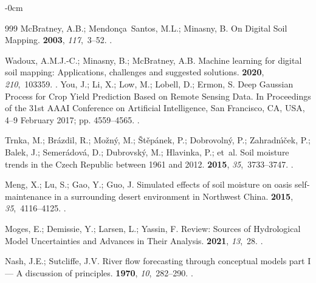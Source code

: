 \documentclass[land,review,accept,pdftex,oneauthor]{Definitions/mdpi}
\begin{document}
\begin{adjustwidth}{-\extralength}{0cm}
\begin{thebibliography}{999}
McBratney, A.B.; Mendon\c{c}a~Santos, M.L.; Minasny, B.
\newblock On Digital Soil Mapping.
 {\bf 2003}, {\em 117},~3--52.
.

Wadoux, A.M.J.-C.; Minasny, B.; McBratney, A.B.
\newblock Machine learning for digital soil mapping: Applications, challenges and suggested solutions.
 {\bf 2020}, {\em 210},~103359.
.
You, J.; Li, X.; Low, M.; Lobell, D.; Ermon, S.
\newblock Deep Gaussian Process for Crop Yield Prediction Based on Remote
  Sensing Data.
\newblock In Proceedings of the 31st AAAI Conference on
  Artificial Intelligence, San Francisco, CA, USA,  4--9 February 2017; pp. 4559--4565.
.

Trnka, M.; Br{\'a}zdil, R.; Mo{\v z}n{\'y}, M.; {\v S}t{\v e}p{\'a}nek, P.;
  Dobrovoln{\'y}, P.; Zahradn{\'\i}{\v c}ek, P.; Balek, J.; Semer{\'a}dov{\'a},
  D.; Dubrovsk{\'y}, M.; Hlavinka, P.;  et~al.
\newblock Soil moisture trends in the Czech Republic between 1961 and 2012.
 {\bf 2015}, {\em
  35},~3733--3747.
.

Meng, X.; Lu, S.; Gao, Y.; Guo, J.
\newblock Simulated effects of soil moisture on oasis self-maintenance in a
  surrounding desert environment in Northwest China.
 {\bf 2015}, {\em
  35},~4116--4125.
.

Moges, E.; Demissie, Y.; Larsen, L.; Yassin, F.
\newblock Review: Sources of Hydrological Model Uncertainties and Advances in
  Their Analysis.
 {\bf 2021}, {\em 13},~28.
.

Nash, J.E.; Sutcliffe, J.V.
\newblock River flow forecasting through conceptual models part {I} --- {A}
  discussion of principles.
 {\bf 1970}, {\em 10},~282--290.
.


\end{thebibliography}
\end{adjustwidth}
\end{document}
